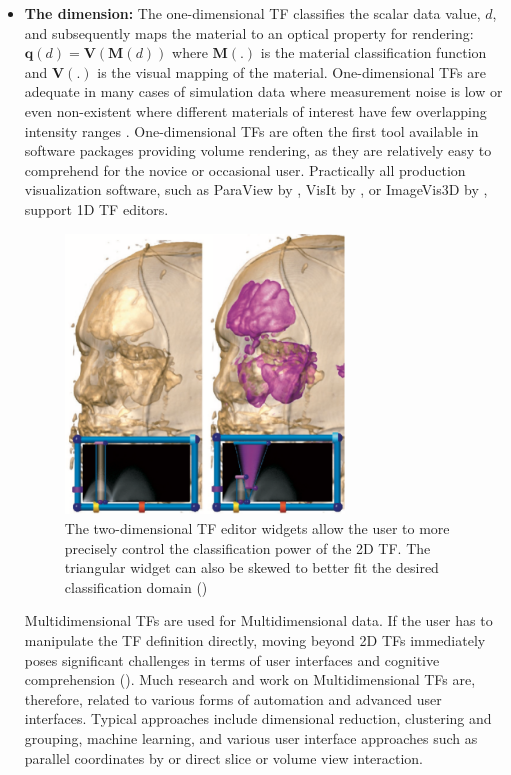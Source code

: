 \begin{itemize}
\item \textbf{The dimension: } The one-dimensional TF classifies the scalar data value, $d$, and subsequently maps the material to an optical property for rendering: $ \textbf{q}(d)=\textbf{V}(\textbf{M}(d))$ where $\textbf{M}(.)$ is the material classification function and $\textbf{V}(.)$ is the
visual mapping of the material. One-dimensional TFs are adequate in many cases of simulation data where measurement noise is low or even non-existent where different materials of interest have few overlapping intensity
ranges \cite{4303986}. One-dimensional TFs are often the first tool available in software packages providing volume rendering, as they are relatively easy to comprehend for the novice or occasional user. Practically all production
visualization software, such as ParaView by \cite{paraview},
 VisIt by \cite{Childs:SciDAC2011}, 
or ImageVis3D by {\cite{Fogal2010Tuvok}}, support 1D TF editors.

\begin{figure}[th]
\centering
\includegraphics[width=0.7\textwidth]{Figures/2dtf}
\decoRule
\caption[2D transfer Function]{ The two-dimensional TF editor widgets allow the user
to more precisely control the classification power of the 2D TF.
The triangular widget can also be skewed to better fit the desired
classification domain (\cite{1021579}) }
\label{fig:tf2d}
\end{figure}

Multidimensional TFs are used for Multidimensional data. If the user has to manipulate the TF definition directly, moving beyond
2D TFs immediately poses significant challenges in terms of
user interfaces and cognitive comprehension (\cite{1021579}). Much research and
work on Multidimensional TFs are, therefore, related to various forms of automation
and advanced user interfaces. Typical approaches include dimensional reduction, clustering
and grouping, machine learning, and various user interface
approaches such as parallel coordinates by \cite{5742368} or direct slice or volume
view interaction. 


\end{itemize}
